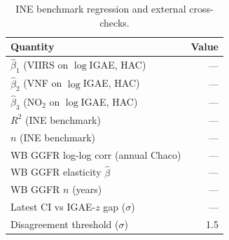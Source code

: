 \begin{table}[H]
\centering
\caption{INE benchmark regression and external cross-checks.}
\label{tab:ine_vs_sat}
\small
\begin{tabular}{lr}
\toprule
Quantity & Value \\
\midrule
$\hat\beta_1$ (VIIRS on $\log$IGAE, HAC)  & --- \\
$\hat\beta_2$ (VNF on $\log$IGAE, HAC)    & --- \\
$\hat\beta_3$ (NO$_2$ on $\log$IGAE, HAC) & --- \\
$R^2$ (INE benchmark)                     & --- \\
$n$ (INE benchmark)                       & --- \\
\midrule
WB GGFR log-log corr (annual Chaco)       & --- \\
WB GGFR elasticity $\hat\beta$            & --- \\
WB GGFR $n$ (years)                       & --- \\
\midrule
Latest CI vs IGAE-$z$ gap ($\sigma$)      & --- \\
Disagreement threshold ($\sigma$)         & 1.5 \\
\bottomrule
\end{tabular}
\end{table}
